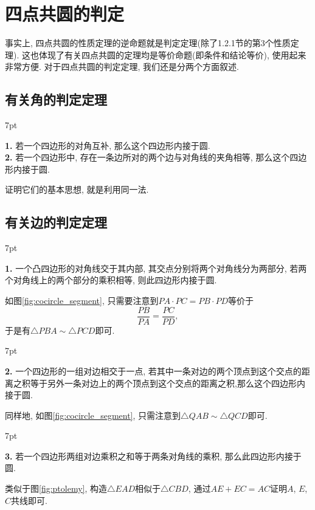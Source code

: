 \documentclass{book}
\newenvironment{theorem}{%
\def\FrameCommand{%
\hspace{1pt}%
{\color{cyan!60!blue}\vrule width 2pt}%
{\color{cyan!10}\vrule width 4pt}%
\colorbox{cyan!10}%
}%
\MakeFramed{\advance\hsize-\width\FrameRestore}%
\noindent\hspace{-4.55pt}%
\begin{adjustwidth}{}{7pt}%
\vspace{2pt}\vspace{2pt}%
}
{%
\vspace{2pt}\end{adjustwidth}\endMakeFramed%
}
\begin{document}
\section{四点共圆的判定}
\begin{paracol}{2}
事实上, 四点共圆的性质定理的逆命题就是判定定理(除了1.2.1节的第3个性质定理). 这也体现了有关四点共圆的定理均是等价命题(即条件和结论等价), 使用起来非常方便. 对于四点共圆的判定定理, 我们还是分两个方面叙述.\par

\subsection{有关角的判定定理}
\begin{theorem}
	\textbf{1. }{\kaishu 若一个四边形的对角互补, 那么这个四边形内接于圆.}\\
	\textbf{2. }{\kaishu 若一个四边形中, 存在一条边所对的两个边与对角线的夹角相等, 那么这个四边形内接于圆.}
\end{theorem}
\par
证明它们的基本思想, 就是利用同一法.\par
\subsection{有关边的判定定理}
\begin{theorem}
	\textbf{1. }{\kaishu 一个凸四边形的对角线交于其内部, 其交点分别将两个对角线分为两部分, 若两个对角线上的两个部分的乘积相等, 则此四边形内接于圆.}
\end{theorem}
\par
如图\ref{fig:cocircle_segment}, 只需要注意到$PA\cdot PC=PB\cdot PD$等价于
\[\frac{PB}{PA}=\frac{PC}{PD},\]
于是有$\triangle PBA\sim\triangle PCD$即可.
\begin{theorem}
	\textbf{2. }{\kaishu 一个四边形的一组对边相交于一点, 若其中一条对边的两个顶点到这个交点的距离之积等于另外一条对边上的两个顶点到这个交点的距离之积,那么这个四边形内接于圆.}
\end{theorem}
\par
同样地, 如图\ref{fig:cocircle_segment}, 只需注意到$\triangle QAB\sim\triangle QCD$即可.
\begin{theorem}
	\textbf{3. }{\kaishu 若一个四边形两组对边乘积之和等于两条对角线的乘积, 那么此四边形内接于圆. }
\end{theorem}
\par
类似于图\ref{fig:ptolemy}, 构造$\triangle EAD$相似于$\triangle CBD$, 通过$AE+EC=AC$证明$A$, $E$,
$C$共线即可.

\end{paracol}
\end{document}
